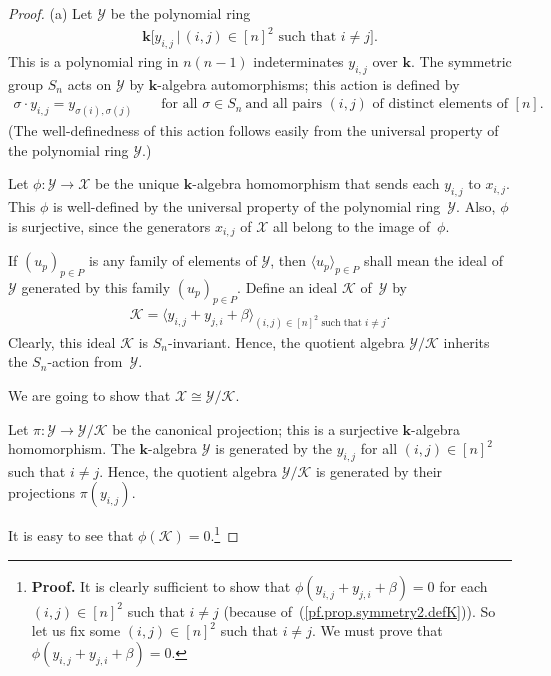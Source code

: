 \documentclass[pdftex]{sigma}
\numberwithin{equation}{section}
\begin{document}
\begin{proof}(a) Let $\mathcal{Y}$ be the polynomial ring
\begin{gather*}
\mathbf{k}\big[ y_{i,j}\,|\, (i,j) \in[n]^{2}\text{ such that }i\neq j\big] .
\end{gather*}
This is a polynomial ring in $n(n-1) $ indeterminates $y_{i,j}$ over $\mathbf{k}$. The symmetric group $S_{n}$ acts on $\mathcal{Y}$ by $\mathbf{k}$-algebra automorphisms; this action is defined by
\begin{gather*}
\sigma\cdot y_{i,j}=y_{\sigma(i) ,\sigma(j)}\qquad \text{for all }\sigma\in S_{n}\ \text{and all pairs }(i,j) \text{ of distinct elements of }[n] .
\end{gather*}
(The well-definedness of this action follows easily from the universal property of the polynomial ring $\mathcal{Y}$.)

Let $\phi\colon \mathcal{Y}\rightarrow\mathcal{X}$ be the unique $\mathbf{k} $-algebra homomorphism that sends each $y_{i,j}$ to $x_{i,j}$. This $\phi$ is well-defined by the universal property of the polynomial ring~$\mathcal{Y}$. Also, $\phi$ is surjective, since the generators $x_{i,j}$ of $\mathcal{X}$ all belong to the image of~$\phi$.

If $(u_{p}) _{p\in P}$ is any family of elements of $\mathcal{Y}$, then $\langle u_{p}\rangle _{p\in P}$ shall mean the ideal of $\mathcal{Y}$ generated by this family $(u_{p}) _{p\in P}$. Define an ideal $\mathcal{K}$ of~$\mathcal{Y}$ by
\begin{gather}
\mathcal{K}= \langle y_{i,j}+y_{j,i}+\beta \rangle _{(i,j ) \in[n] ^{2}\text{ such that }i\neq j}.\label{pf.prop.symmetry2.defK}
\end{gather}
Clearly, this ideal $\mathcal{K}$ is $S_{n}$-invariant. Hence, the quotient algebra $\mathcal{Y}/\mathcal{K}$ inherits the $S_{n}$-action from~$\mathcal{Y}$.

We are going to show that $\mathcal{X}\cong\mathcal{Y}/\mathcal{K}$.

Let $\pi\colon \mathcal{Y}\rightarrow\mathcal{Y}/\mathcal{K}$ be the canonical projection; this is a surjective $\mathbf{k}$-algebra homomorphism. The $\mathbf{k}$-algebra $\mathcal{Y}$ is generated by the $y_{i,j}$ for all $(i,j) \in[n] ^{2}$ such that $i\neq j$. Hence, the quotient algebra $\mathcal{Y}/\mathcal{K}$ is generated by their projections $\pi(y_{i,j}) $.

It is easy to see that $\phi ( \mathcal{K} ) =0$.\footnote{\textbf{Proof.} It is clearly sufficient to show that $\phi ( y_{i,j}+y_{j,i}+\beta ) =0$ for each $(i,j) \in[n] ^{2}$ such that $i\neq j$ (because of~(\ref{pf.prop.symmetry2.defK})). So let us fix some $(i,j) \in[n] ^{2}$ such that $i\neq j$. We must prove that $\phi ( y_{i,j}+y_{j,i}+\beta ) =0$.

}
\end{proof}
\end{document}
